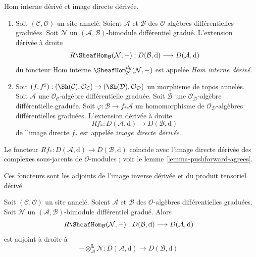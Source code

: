 \begin{definition}
\label{definition-pushforward}
Hom interne dérivé et image directe dérivée.
\begin{enumerate}
\item Soit $(\mathcal{C}, \mathcal{O})$ un site annelé. Soient
$\mathcal{A}$ et $\mathcal{B}$ des $\mathcal{O}$-algèbres différentielles graduées.
Soit $\mathcal{N}$ un
$(\mathcal{A}, \mathcal{B})$-bimodule différentiel gradué. L'extension dérivée à droite
$$
R\SheafHom_\mathcal{B}(\mathcal{N}, -) :
D(\mathcal{B}, \text{d})
\longrightarrow
D(\mathcal{A}, \text{d})
$$
du foncteur Hom interne $\SheafHom_\mathcal{B}^{dg}(\mathcal{N}, -)$ est
appelée {\it Hom interne dérivé}.
\item Soit $(f, f^\sharp) : (\Sh(\mathcal{C}), \mathcal{O}_\mathcal{C})
\to (\Sh(\mathcal{D}), \mathcal{O}_\mathcal{D})$ un morphisme
de topos annelés. Soit $\mathcal{A}$ une
$\mathcal{O}_\mathcal{C}$-algèbre différentielle graduée. Soit $\mathcal{B}$ une
$\mathcal{O}_\mathcal{D}$-algèbre différentielle graduée. Soit
$\varphi : \mathcal{B} \to f_*\mathcal{A}$ un homomorphisme de
$\mathcal{O}_\mathcal{D}$-algèbres différentielles graduées. L'extension
dérivée à droite
$$ Rf_*
:
D(\mathcal{A}, \text{d})
\longrightarrow
D(\mathcal{B}, \text{d})
$$ de
l'image directe $f_*$ est appelée {\it image directe dérivée}.
\end{enumerate}
\end{definition}

\noindent
Le foncteur
$Rf_* : D(\mathcal{A}, \text{d}) \to D(\mathcal{B}, \text{d})$ coïncide
avec l'image directe dérivée des complexes sous-jacents de
$\mathcal{O}$-modules ; voir le lemme \ref{lemma-pushforward-agrees}.

\medskip\noindent Ces
foncteurs sont les adjoints de l'image inverse dérivée et du
produit tensoriel dérivé.

\begin{lemma}
\label{lemma-derived-adjoint-tensor-hom}
Soit $(\mathcal{C}, \mathcal{O})$ un site annelé. Soient
$\mathcal{A}$ et $\mathcal{B}$ des $\mathcal{O}$-algèbres différentielles graduées.
Soit $\mathcal{N}$ un
$(\mathcal{A}, \mathcal{B})$-bimodule différentiel gradué. Alors
$$
R\SheafHom_\mathcal{B}(\mathcal{N}, -) :
D(\mathcal{B}, \text{d})
\longrightarrow
D(\mathcal{A}, \text{d})
$$ est
adjoint à droite à
$$
- \otimes_\mathcal{A}^\mathbf{L} \mathcal{N} :
D(\mathcal{A}, \text{d})
\longrightarrow
D(\mathcal{B}, \text{d})
$$
\end{lemma}

